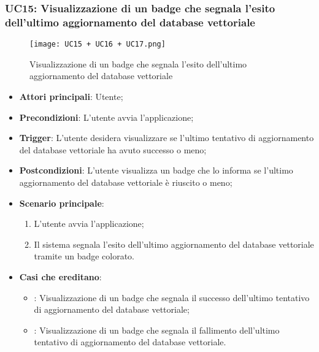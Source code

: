 \newpage

\hypertarget{UC15}{}
\subsubsection{UC15: Visualizzazione di un badge che segnala l'esito dell'ultimo aggiornamento del database vettoriale}

\begin{figure}[h]
    \centering
    \texttt{[image: UC15 + UC16 + UC17.png]}
    \caption{Visualizzazione di un badge che segnala l'esito dell'ultimo aggiornamento del database vettoriale}
\end{figure}

\begin{itemize}
    \item \textbf{Attori principali}: Utente;
    \item \textbf{Precondizioni}: L'utente avvia l'applicazione;
    \item \textbf{Trigger}: L'utente desidera visualizzare se l'ultimo tentativo di aggiornamento del database vettoriale
    ha avuto successo o meno;
    \item \textbf{Postcondizioni}: L'utente visualizza un badge che lo informa se l'ultimo aggiornamento del database vettoriale
    è riuscito o meno;
    \item \textbf{Scenario principale}:
    \begin{enumerate}
        \item L'utente avvia l'applicazione;
        \item Il sistema segnala l'esito dell'ultimo aggiornamento del database vettoriale tramite un badge colorato.
    \end{enumerate}
    \item \textbf{Casi che ereditano}:
    \begin{itemize}
        \item {}: Visualizzazione di un badge che segnala il successo dell'ultimo tentativo di aggiornamento del database vettoriale;
        \item {}: Visualizzazione di un badge che segnala il fallimento dell'ultimo tentativo di aggiornamento del database vettoriale.
    \end{itemize}
\end{itemize}

\hypertarget{UC16}{}
